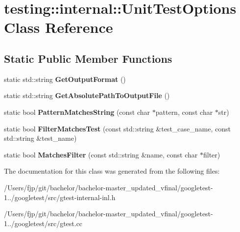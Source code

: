 \hypertarget{classtesting_1_1internal_1_1_unit_test_options}{}\section{testing\+:\+:internal\+:\+:Unit\+Test\+Options Class Reference}
\label{classtesting_1_1internal_1_1_unit_test_options}
\subsection*{Static Public Member Functions}
\begin{DoxyCompactItemize}
\item 
\mbox{\label{classtesting_1_1internal_1_1_unit_test_options_ae7413a21296d885c6924650b51ac4f6d}} 
static std\+::string {\bfseries Get\+Output\+Format} ()
\item 
\mbox{\label{classtesting_1_1internal_1_1_unit_test_options_a993fb30ad66104158c8c0ac508daca3f}} 
static std\+::string {\bfseries Get\+Absolute\+Path\+To\+Output\+File} ()
\item 
\mbox{\label{classtesting_1_1internal_1_1_unit_test_options_af0235a2ee26dd6db21305e11d2358e4f}} 
static bool {\bfseries Pattern\+Matches\+String} (const char $\ast$pattern, const char $\ast$str)
\item 
\mbox{\label{classtesting_1_1internal_1_1_unit_test_options_a9975b59cece94874b303421697e3bca6}} 
static bool {\bfseries Filter\+Matches\+Test} (const std\+::string \&test\+\_\+case\+\_\+name, const std\+::string \&test\+\_\+name)
\item 
\mbox{\label{classtesting_1_1internal_1_1_unit_test_options_a67fc0adaffbb8d320b92e42e05017e4e}} 
static bool {\bfseries Matches\+Filter} (const std\+::string \&name, const char $\ast$filter)
\end{DoxyCompactItemize}


The documentation for this class was generated from the following files\+:\begin{DoxyCompactItemize}
\item 
/\+Users/fjp/git/bachelor/bachelor-\/master\+\_\+updated\+\_\+vfinal/googletest-\/1../googletest/src/gtest-\/internal-\/inl.\+h\item 
/\+Users/fjp/git/bachelor/bachelor-\/master\+\_\+updated\+\_\+vfinal/googletest-\/1../googletest/src/gtest.\+cc\end{DoxyCompactItemize}
